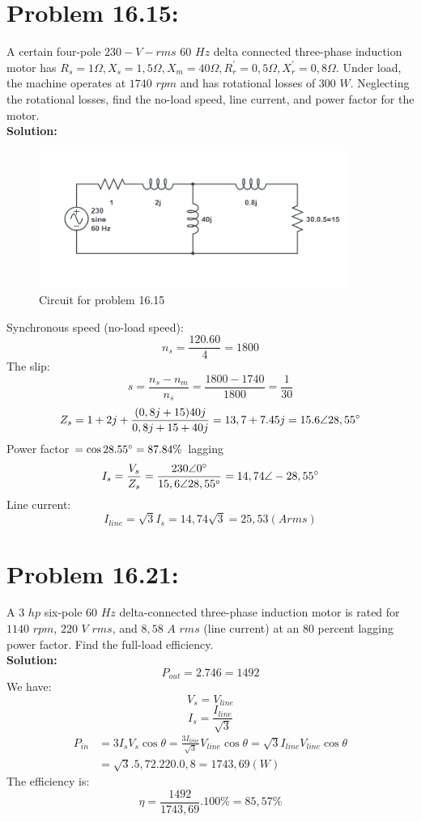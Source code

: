 \documentclass[9pt]{extarticle}
\begin{document}
\section*{Problem 16.15:}
A certain four-pole $230-V-rms$ $60$ $Hz$ delta connected three-phase induction motor has
$R_{s} = 1\Omega, X_{s} = 1,5\Omega, X_{m}=40\Omega,R_{r}^{'}=0,5\Omega,X_{r}^{'}=0,8\Omega$.    
Under load, the machine operates at $1740$ 
$rpm$ and has rotational losses of $300$ $W$. Neglecting the rotational losses, find the 
no-load speed, line current, and power 
factor for the motor.
\\ \textbf{Solution:}
\begin{figure}[h]
   \centering
   \includegraphics[width=0.9\textwidth]{circuit.png}
   \caption{Circuit for problem 16.15}
   \label{nem_ngang}
   \end{figure}
Synchronous speed (no-load speed):
$$n_{s}=\frac{120.60}{4}=1800$$
The slip:
$$s=\frac{n_{s}-n_{m}}{n_{s}}=\frac{1800-1740}{1800}=\frac{1}{30}$$
$$Z_{s}=1+2j+\frac{(0,8j+15)40j}{0,8j+15+40j}=13,7+7.45j=15.6\angle 28,55\degree$$
Power factor $=\cos{28.55\degree}=87.84\%$ lagging
$$I_{s}=\frac{V_{s}}{Z_{s}}=\frac{230\angle 0\degree}{15,6\angle 28,55\degree}=14,74\angle -28,55\degree$$
Line current:
$$I_{line}=\sqrt{3}I_{s}=14,74\sqrt{3}=25,53 (A rms)$$
\section*{Problem 16.21:}
A $3$ $hp$ six-pole $60$ $Hz$ delta-connected 
three-phase induction motor is rated for 
$1140$ $rpm$, $220$ $V$ $rms$, and $8,58$ $A$ $rms$ (line 
current) at an $80$ percent lagging power 
factor. Find the full-load efficiency.
\\ \textbf{Solution:}
$$P_{out}=2.746=1492$$
We have:
$$V_{s}=V_{line}$$
$$I_{s}=\frac{I_{line}}{\sqrt{3}}$$
\begin{align*}
P_{in}&=3I_{s}V_{s}\cos{\theta}=\frac{3I_{line}}{\sqrt{3}}V_{line}\cos{\theta}=\sqrt{3}I_{line}V_{line}\cos{\theta}\\&=\sqrt{3}.5,72.220.0,8=1743,69 (W)
\end{align*}
The efficiency is:
$$\eta=\frac{1492}{1743,69}.100\%=85,57\%$$
\end{document}
